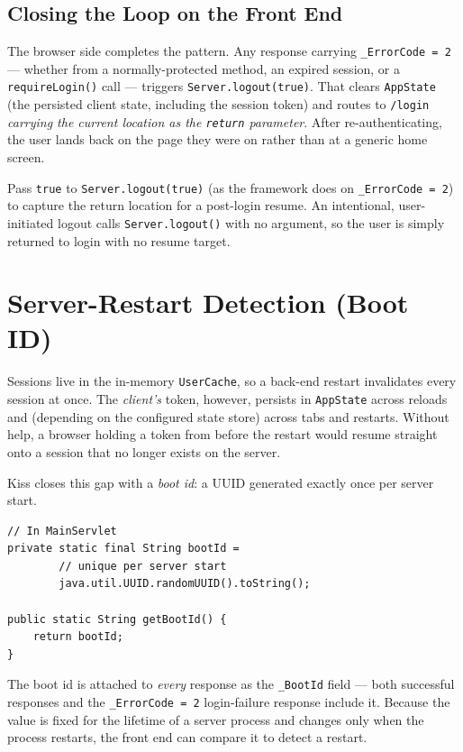 \subsection{Closing the Loop on the Front End}

The browser side completes the pattern.  Any response carrying \texttt{\_ErrorCode = 2} --- whether from a normally-protected method, an expired session, or a \texttt{requireLogin()} call --- triggers \texttt{Server.logout(true)}.  That clears \texttt{AppState} (the persisted client state, including the session token) and routes to \texttt{/login} \emph{carrying the current location as the \texttt{return} parameter}.  After re-authenticating, the user lands back on the page they were on rather than at a generic home screen.

\begin{tipbox}
Pass \texttt{true} to \texttt{Server.logout(true)} (as the framework does on \texttt{\_ErrorCode = 2}) to capture the return location for a post-login resume.  An intentional, user-initiated logout calls \texttt{Server.logout()} with no argument, so the user is simply returned to login with no resume target.
\end{tipbox}

\section{Server-Restart Detection (Boot ID)}
\label{sec:auth-boot-id}

Sessions live in the in-memory \texttt{UserCache}, so a back-end restart invalidates every session at once.  The \emph{client's} token, however, persists in \texttt{AppState} across reloads and (depending on the configured state store) across tabs and restarts.  Without help, a browser holding a token from before the restart would resume straight onto a session that no longer exists on the server.

Kiss closes this gap with a \emph{boot id}: a UUID generated exactly once per server start.

\begin{lstlisting}[style=java]
// In MainServlet
private static final String bootId =
        // unique per server start
        java.util.UUID.randomUUID().toString();

public static String getBootId() {
    return bootId;
}
\end{lstlisting}

\noindent
The boot id is attached to \emph{every} response as the \texttt{\_BootId} field --- both successful responses and the \texttt{\_ErrorCode = 2} login-failure response include it.  Because the value is fixed for the lifetime of a server process and changes only when the process restarts, the front end can compare it to detect a restart.

